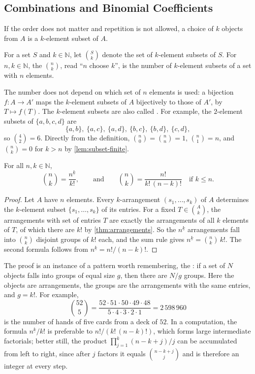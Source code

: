 \subsection{Combinations and Binomial Coefficients}

If the order does not matter and repetition is not allowed, a choice of $k$ objects from $A$ is a $k$-element subset of $A$.

\begin{definition}
\label{def:binomial}
For a set $S$ and $k\in\mathbb N$, let $\binom Sk$ denote the set of $k$-element subsets of $S$. For $n,k\in\mathbb N$, the  $\binom nk$, read ``$n$ choose $k$'', is the number of $k$-element subsets of a set with $n$ elements.
\end{definition}

The number does not depend on which set of $n$ elements is used: a bijection $f\colon A\to A'$ maps the $k$-element subsets of $A$ bijectively to those of $A'$, by $T\mapsto f(T)$. The $k$-element subsets are also called . For example, the $2$-element subsets of $\{a,b,c,d\}$ are
\[
\{a,b\},\ \{a,c\},\ \{a,d\},\ \{b,c\},\ \{b,d\},\ \{c,d\},
\]
so $\binom42=6$. Directly from the definition, $\binom n0=\binom nn=1$, $\binom n1=n$, and $\binom nk=0$ for $k>n$ by \cref{lem:subset-finite}.

\begin{theorem}
\label{thm:binomial-formula}
For all $n,k\in\mathbb N$,
\[
\binom nk=\frac{n^{\underline k}}{k!},\qquad\text{and}\qquad\binom nk=\frac{n!}{k!\,(n-k)!}\quad\text{if }k\le n .
\]
\end{theorem}

\begin{proof}
Let $A$ have $n$ elements. Every $k$-arrangement $(s_1,\ldots,s_k)$ of $A$ determines the $k$-element subset $\{s_1,\ldots,s_k\}$ of its entries. For a fixed $T\in\binom Ak$, the arrangements with set of entries $T$ are exactly the arrangements of all $k$ elements of $T$, of which there are $k!$ by \cref{thm:arrangements}. So the $n^{\underline k}$ arrangements fall into $\binom nk$ disjoint groups of $k!$ each, and the sum rule gives $n^{\underline k}=\binom nk\,k!$. The second formula follows from $n^{\underline k}=n!/(n-k)!$.
\end{proof}

The proof is an instance of a pattern worth remembering, the : if a set of $N$ objects falls into groups of equal size $g$, then there are $N/g$ groups. Here the objects are arrangements, the groups are the arrangements with the same entries, and $g=k!$. For example,
\[
\binom{52}{5}=\frac{52\cdot51\cdot50\cdot49\cdot48}{5\cdot4\cdot3\cdot2\cdot1}=2\,598\,960
\]
is the number of hands of five cards from a deck of $52$. In a computation, the formula $n^{\underline k}/k!$ is preferable to $n!/(k!\,(n-k)!)$, which forms large intermediate factorials; better still, the product $\prod_{j=1}^{k}(n-k+j)/j$ can be accumulated from left to right, since after $j$ factors it equals $\binom{n-k+j}{j}$ and is therefore an integer at every step.

